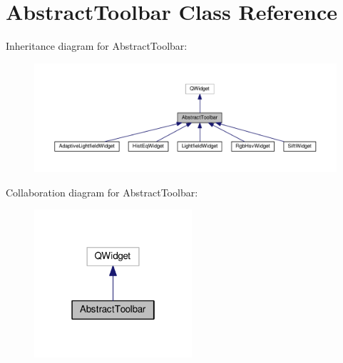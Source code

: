 \hypertarget{classAbstractToolbar}{}\section{Abstract\+Toolbar Class Reference}
\label{classAbstractToolbar}


Inheritance diagram for Abstract\+Toolbar\+:\nopagebreak
\begin{figure}[H]
\begin{center}
\leavevmode
\includegraphics[width=350pt]{classAbstractToolbar__inherit__graph}
\end{center}
\end{figure}


Collaboration diagram for Abstract\+Toolbar\+:\nopagebreak
\begin{figure}[H]
\begin{center}
\leavevmode
\includegraphics[width=166pt]{classAbstractToolbar__coll__graph}
\end{center}
\end{figure}
